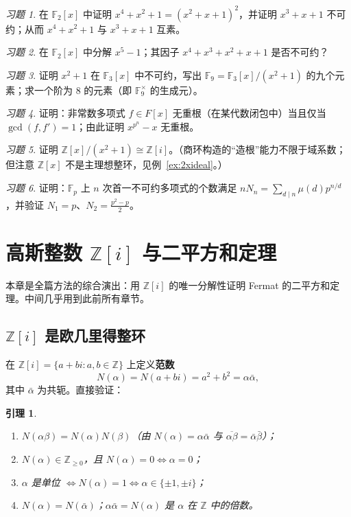 \documentclass[a4paper,11pt]{ctexart}
\numberwithin{equation}{section}
\theoremstyle{plain}
\newtheorem{lemma}[theorem]{引理}
\theoremstyle{definition}
\theoremstyle{remark}
\newtheorem{exercise}{习题}[section]
\newcommand{\Z}{\mathbb{Z}}
\newcommand{\F}{\mathbb{F}}
\newcommand{\Ga}{\mathbb{Z}[i]}
\begin{document}
\begin{exercise}\label{ex:7-1}
在 $\F_2[x]$ 中证明 $x^4+x^2+1=(x^2+x+1)^2$，并证明 $x^3+x+1$ 不可约；从而 $x^4+x^2+1$ 与 $x^3+x+1$ 互素。
\end{exercise}

\begin{exercise}\label{ex:7-2}
在 $\F_2[x]$ 中分解 $x^5-1$；其因子 $x^4+x^3+x^2+x+1$ 是否不可约？
\end{exercise}

\begin{exercise}\label{ex:7-3}
证明 $x^2+1$ 在 $\F_3[x]$ 中不可约，写出 $\F_9=\F_3[x]/(x^2+1)$ 的九个元素；求一个阶为 $8$ 的元素（即 $\F_9^{\times}$ 的生成元）。
\end{exercise}

\begin{exercise}\label{ex:7-4}
证明：非常数多项式 $f\in F[x]$ 无重根（在某代数闭包中）当且仅当 $\gcd(f,f')=1$；由此证明 $x^{p^n}-x$ 无重根。
\end{exercise}

\begin{exercise}\label{ex:7-5}
证明 $\Z[x]/(x^2+1)\cong\Z[i]$。（商环构造的“造根”能力不限于域系数；但注意 $\Z[x]$ 不是主理想整环，见例~\ref{ex:2xideal}。）
\end{exercise}

\begin{exercise}\label{ex:7-6}
证明：$\F_p$ 上 $n$ 次首一不可约多项式的个数满足 $nN_n=\sum_{d\mid n}\mu(d)p^{n/d}$，并验证 $N_1=p$、$N_2=\frac{p^2-p}2$。
\end{exercise}

\newpage

\section{高斯整数 $\Ga$ 与二平方和定理}\label{sec:Gauss}

本章是全篇方法的综合演出：用 $\Ga$ 的唯一分解性证明 Fermat 的二平方和定理。中间几乎用到此前所有章节。

\subsection{$\Ga$ 是欧几里得整环}

在 $\Ga=\{a+bi:a,b\in\Z\}$ 上定义\textbf{范数}
\[
N(\alpha)=N(a+bi)=a^2+b^2=\alpha\bar\alpha,
\]
其中 $\bar\alpha$ 为共轭。直接验证：

\begin{lemma}\label{lem:normprops}
\begin{enumerate}[itemsep=0.1em]
  \item $N(\alpha\beta)=N(\alpha)N(\beta)$（由 $N(\alpha)=\alpha\bar\alpha$ 与 $\overline{\alpha\beta}=\bar\alpha\bar\beta$）；
  \item $N(\alpha)\in\Z_{\ge0}$，且 $N(\alpha)=0\iff\alpha=0$；
  \item $\alpha$ 是单位 $\iff N(\alpha)=1\iff\alpha\in\{\pm1,\pm i\}$；
  \item $N(\alpha)=N(\bar\alpha)$；$\alpha\bar\alpha=N(\alpha)$ 是 $\alpha$ 在 $\Z$ 中的倍数。
\end{enumerate}
\end{lemma}
\end{document}
